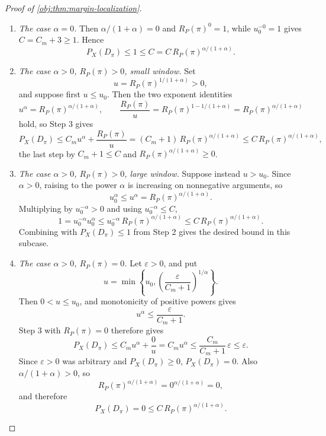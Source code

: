 \begin{proof}[Proof of \cref{obj:thm:margin-localization}]
\begin{enumerate}
\item \emph{The case \(\alpha=0\).}  Then \(\alpha/(1+\alpha)=0\) and \(R_P(\pi)^0=1\), while \(u_0^{-0}=1\) gives \(C=C_m+3\ge1\).  Hence
\[
P_X(D_\pi)\le1\le C=C\,R_P(\pi)^{\alpha/(1+\alpha)} .
\]

\item \emph{The case \(\alpha>0\), \(R_P(\pi)>0\), small window.}  Set
\[
u=R_P(\pi)^{1/(1+\alpha)}>0,
\]
and suppose first \(u\le u_0\).  Then the two exponent identities
\[
u^\alpha=R_P(\pi)^{\alpha/(1+\alpha)},
\qquad
\frac{R_P(\pi)}u=R_P(\pi)^{1-1/(1+\alpha)}=R_P(\pi)^{\alpha/(1+\alpha)}
\]
hold, so Step 3 gives
\[
P_X(D_\pi)
\le C_m u^\alpha+\frac{R_P(\pi)}u
=(C_m+1)\,R_P(\pi)^{\alpha/(1+\alpha)}
\le C\,R_P(\pi)^{\alpha/(1+\alpha)},
\]
the last step by \(C_m+1\le C\) and \(R_P(\pi)^{\alpha/(1+\alpha)}\ge0\). %

\item \emph{The case \(\alpha>0\), \(R_P(\pi)>0\), large window.}  Suppose instead \(u>u_0\).  Since \(\alpha>0\), raising to the power \(\alpha\) is increasing on nonnegative arguments, so
\[
u_0^\alpha\le u^\alpha=R_P(\pi)^{\alpha/(1+\alpha)}.
\]
Multiplying by \(u_0^{-\alpha}>0\) and using \(u_0^{-\alpha}\le C\),
\[
1=u_0^{-\alpha}u_0^\alpha
\le u_0^{-\alpha}\,R_P(\pi)^{\alpha/(1+\alpha)}
\le C\,R_P(\pi)^{\alpha/(1+\alpha)} .
\]
Combining with \(P_X(D_\pi)\le1\) from Step 2 gives the desired bound in this subcase. %

\item \emph{The case \(\alpha>0\), \(R_P(\pi)=0\).}  Let \(\varepsilon>0\), and put
\[
u=\min\left\{u_0,\left(\frac{\varepsilon}{C_m+1}\right)^{1/\alpha}\right\}.
\]
Then \(0<u\le u_0\), and monotonicity of positive powers gives
\[
u^\alpha\le \frac{\varepsilon}{C_m+1}.
\]
Step 3 with \(R_P(\pi)=0\) therefore gives
\[
P_X(D_\pi)\le C_m u^\alpha+\frac 0u
=C_m u^\alpha
\le \frac{C_m}{C_m+1}\,\varepsilon
\le \varepsilon.
\]
Since \(\varepsilon>0\) was arbitrary and \(P_X(D_\pi)\ge0\), \(P_X(D_\pi)=0\).  Also \(\alpha/(1+\alpha)>0\), so
\[
R_P(\pi)^{\alpha/(1+\alpha)}=0^{\alpha/(1+\alpha)}=0,
\]
and therefore
\[
P_X(D_\pi)=0\le C\,R_P(\pi)^{\alpha/(1+\alpha)} .
\]
\end{enumerate}
\end{proof}

